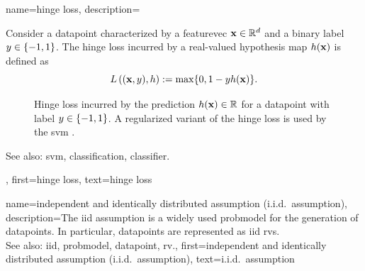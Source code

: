 {name={hinge loss}, 
	description={Consider a \gls{datapoint} 
		characterized by a \gls{featurevec} ${\bf x} \in \mathbb{R}^{d}$ and a 
		binary \gls{label} $y \in \{-1,1\}$. The hinge \gls{loss} incurred by a real-valued 
		\gls{hypothesis} \gls{map} $h({\bf x})$ is defined as 
		\begin{equation} 
			\label{equ_hinge_loss_gls_dict}
			L\left(({\bf x},y),h \right) := \max \{ 0 , 1 - y h({\bf x}) \}. 
		\end{equation}
		\begin{figure}[H]
		\begin{center}
		\caption{Hinge \gls{loss} incurred by the \gls{prediction} $h({\bf x}) \in \mathbb{R}$ 
			for a \gls{datapoint} with \gls{label} $y \in \{-1,1\}$. A regularized variant of the hinge 
			\gls{loss} is used by the \gls{svm} \cite{LampertNowKernel}.}
			\label{fig_hingeloss_dict}
		\end{center}
		\end{figure} 	    
		See also: \gls{svm}, \gls{classification}, \gls{classifier}.},
	first={hinge loss},
	text={hinge loss}
}

{name={independent and identically distributed assumption (i.i.d.\ assumption)}, 
	description={The \gls{iid} assumption 
		is a widely used \gls{probmodel} for the generation of \glspl{datapoint}. 
		In particular, \glspl{datapoint} are represented as \gls{iid} \glspl{rv}.
				\\
		See also: \gls{iid}, \gls{probmodel}, \gls{datapoint}, \gls{rv}.},
	first={independent and identically distributed assumption (i.i.d.\ assumption)},
	text={i.i.d.\ assumption} 
}

